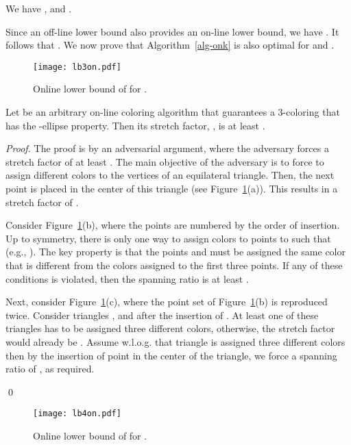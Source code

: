 \documentclass[pdftex,leqno,fleqn,12pts]{llncs}
\begin{document}
\begin{corollary} 
We have ,  and 
.  
\end{corollary}

Since an off-line lower bound also provides an on-line lower bound,
we have . It follows that . 
We now prove that Algorithm~\ref{alg-onk} is also optimal for  and
.

\begin{figure}
\centering\texttt{[image: lb3on.pdf]}\caption{Online lower bound of
 for .}\label{fig-lb3on}
\end{figure}

\begin{lemma} 
Let  be an arbitrary on-line coloring algorithm
that guarantees a 3-coloring that has the -ellipse property. Then
its stretch factor, , is at least .
\end{lemma}
\begin{proof}
The proof is by an adversarial argument, where the adversary forces 
a stretch factor of at least . The main objective of the 
adversary is to force  to assign different colors to 
the vertices of an equilateral triangle. Then, the next point is 
placed in the center of this triangle (see Figure~\ref{fig-lb3on}(a)). 
This results in a stretch factor of .

Consider Figure~\ref{fig-lb3on}(b), where the points are numbered by 
the order of insertion. Up to symmetry, there is only one way to 
assign colors to points  to  such that  
(e.g., ).
The key property is that the points  and  must be assigned the same color that is different from the colors assigned 
to the first three points. If any of these conditions is violated, then the spanning ratio is at least .

Next, consider Figure~\ref{fig-lb3on}(c), where the point set of
Figure~\ref{fig-lb3on}(b) is reproduced twice. 
Consider triangles ,  and 
 after the insertion of 
.
At least one of these triangles has to be assigned three different 
colors, otherwise, the stretch factor would already be .
Assume w.l.o.g. that triangle  is assigned three
different colors then by the insertion of point  in the center of the
triangle, we force a spanning ratio of , as required. 

\qed 
\end{proof}

\begin{figure}
\centering\texttt{[image: lb4on.pdf]}\caption{Online lower bound of
 for .}\label{fig-lb4on}
\end{figure}
\end{document}
